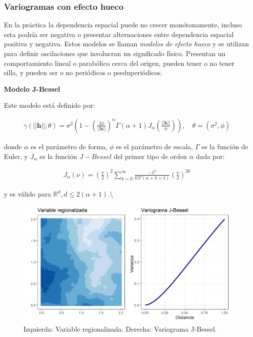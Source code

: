 \documentclass[
]{book}
\begin{document}
\hypertarget{variogramas-con-efecto-hueco}{%
\subsubsection*{Variogramas con efecto hueco}\label{variogramas-con-efecto-hueco}}

En la práctica la dependencia espacial puede no crecer monótonamente, incluso esta podría ser negativa o presentar alternaciones entre dependencia espacial positiva y negativa. Estos modelos se llaman \textit{modelos de efecto hueco} y se utilizan para definir oscilaciones que involucran un significado físico. Presentan un comportamiento lineal o parabólico cerca del origen, pueden tener o no tener silla, y pueden ser o no periódicos o pseduperiódicos.

\textbf{Modelo J-Bessel}

Este modelo está definido por:

\begin{align}
    \gamma(||\textbf{h}||;\theta)=\sigma^2\left(1-\left(\frac{2\phi}{||\textbf{h}||} \right)^{\alpha} \Gamma(\alpha+1)J_\alpha \left(\frac{||\textbf{h}||}{\phi} \right) \right),\quad \theta=(\sigma^2,\phi)
\end{align}

donde \(\alpha\) es el parámetro de forma, \(\phi\) es el parámetro de escala, \(\Gamma\) es la función de Euler, y \(J_\alpha\) es la función \(J-Bessel\) del primer tipo de orden \(\alpha\) dada por:

\begin{align}
    J_\alpha (\nu) =\left(\frac{\nu}{2}\right)^2 \sum_{k=0}^\infty{{\frac{-1^k}{k!\Gamma(\alpha+k+1)}}{\left(\frac{\nu}{2}\right)^{2k}}}
\end{align}

y es válido para \(\mathbb{R}^d, d\leq 2(\alpha+1)\).\textbackslash{}

\begin{figure}
\includegraphics[width=17.78in]{figuras/otros/bes_var} \caption{Izquierda: Variable regionalizada. Derecha: Variograma J-Bessel.}\label{fig:besvar}
\end{figure}
\end{document}
